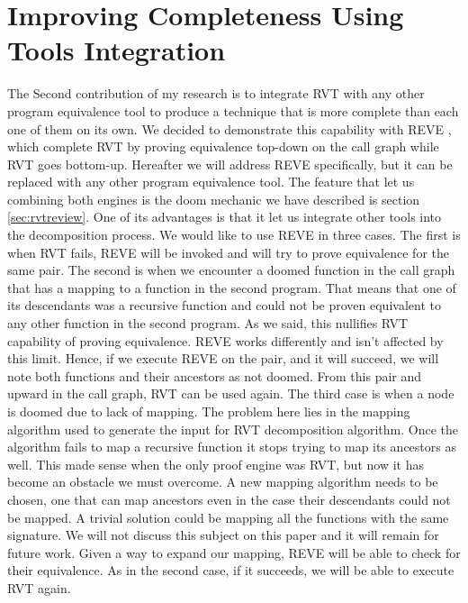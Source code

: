 \section{Improving Completeness Using Tools Integration}
The Second contribution of my research is to integrate RVT with any other program equivalence tool to produce a technique that is more complete than each one of them on its own. We decided to demonstrate this capability with REVE \cite{FelsingGrebingKlebanov2014}, which complete RVT by proving equivalence top-down on the call graph while RVT goes bottom-up. Hereafter we will address REVE specifically, but it can be replaced with any other program equivalence tool. The feature that let us combining both engines is the doom mechanic we have described is section \ref{sec:rvtreview}. One of its advantages is that it let us integrate other tools into the decomposition process. We would like to use REVE in three cases. The first is when RVT fails, REVE will be invoked and will try to prove equivalence for the same pair. The second is when we encounter a doomed function in the call graph that has a mapping to a function in the second program. That means that one of its descendants was a recursive function and could not be proven equivalent to any other function in the second program. As we said, this nullifies RVT capability of proving equivalence. REVE works differently and isn't affected by this limit. Hence, if we execute REVE on the pair, and it will succeed, we will note both functions and their ancestors as not doomed. From this pair and upward in the call graph, RVT can be used again. The third case is when a node is doomed due to lack of mapping. The problem here lies in the mapping algorithm used to generate the input for RVT decomposition algorithm. Once the algorithm fails to map a recursive function it stops trying to map its ancestors as well. This made sense when the only proof engine was RVT, but now it has become an obstacle we must overcome. A new mapping algorithm needs to be chosen, one that can map ancestors even in the case their descendants could not be mapped. A trivial solution could be mapping all the functions with the same signature. We will not discuss this subject on this paper and it will remain for future work. Given a way to expand our mapping, REVE will be able to check for their equivalence. As in the second case, if it succeeds, we will be able to execute RVT again. 

